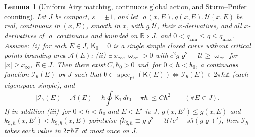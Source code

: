 \documentclass[aps,prd,onecolumn,tightenlines,nofootinbib,notitlepage,10pt,floatfix]{revtex4-2}
\theoremstyle{indentedtheorem}
\newtheorem{lemma}{Lemma}
\begin{document}
\begin{lemma}[Uniform Airy matching, continuous global action, and Sturm--Pr\"ufer counting]\label{lem:scalar_rule}
Let $J$ be compact, $s=\pm 1$, and let $\varrho(x,E),g(x,E),\mathcal{U}(x,E)$ be real, continuous in $(x,E)$, smooth in $x$, with $g,\mathcal{U}$, their $x$-derivatives, and all $x$-derivatives of $\varrho$ continuous and bounded on $\mathbb{R}\times J$, and $0<g_{\min}\le g\le g_{\max}$. Assume: (i)~for each $E\in J$, $\mathsf{K}_0=0$ is a single simple closed curve without critical points bounding area $\mathcal{A}(E)$; (ii)~$\exists\,x_\infty,\varpi_\infty>0$ with $c^2 g\varrho^2-\mathcal{U}\ge\varpi_\infty$ for $|x|\ge x_\infty$, $E\in J$. Then there exist $C,\hbar_0>0$ and, for $0<\hbar<\hbar_0$, a continuous function $\mathcal{I}_\hbar(E)$ on $J$ such that $0\in\operatorname{spec}_\text{pt}(\mathsf{K}(E))\iff\mathcal{I}_\hbar(E)\in 2\pi\hbar\mathbb{Z}$ (each eigenspace simple), and
\begin{equation}
    \Big|\mathcal{I}_\hbar(E) - \mathcal{A}(E) + \hbar\oint\mathsf{K}_1\,dt_0 - \pi\hbar\Big| \le C\hbar^2 \qquad (\forall E\in J) .
    \label{eq:I_hbar_bound}
\end{equation}
If in addition (iii)~for $0<\hbar<\hbar_0$ and $E<E'$ in $J$, $g(x,E')\le g(x,E)$ and $k_{\text{S},\hbar}(x,E')<k_{\text{S},\hbar}(x,E)$ pointwise ($k_{\text{S},\hbar}\equiv g\varrho^2-\mathcal{U}/c^2-s\hbar(g\varrho)'$), then $\mathcal{I}_\hbar$ takes each value in $2\pi\hbar\mathbb{Z}$ at most once on $J$.
\end{lemma}
\end{document}
